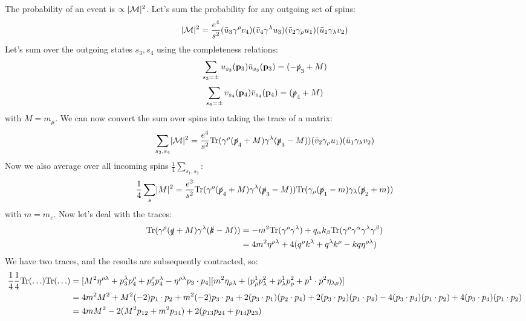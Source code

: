 The probability of an event is $\propto \lvert \mathcal{M} \rvert^2$. Let's sum the probability for any outgoing set of spins:
\begin{equation}
    \lvert \mathcal{M} \rvert^2 = \frac{e^4}{s^2}(\bar{u}_3\gamma^\rho v_4)(\bar{v}_4\gamma^\lambda u_3)(\bar{v}_2\gamma_\rho u_1)(\bar{u}_1\gamma_\lambda v_2)
\end{equation}
Let's sum over the outgoing states $s_3, s_4$ using the completeness relations:
\begin{equation}
    \sum_{s_3 = \pm}u_{s_3}(\mathbf{p}_3)\bar{u}_{s_3}(\mathbf{p}_3) = (-\slashed{p}_3 + M)
\end{equation}
\begin{equation}
    \sum_{s_4 = \pm}v_{s_4}(\mathbf{p}_4)\bar{v}_{s_4}(\mathbf{p}_4) = (\slashed{p}_4 + M)
\end{equation}
with $M = m_\mu$. We can now convert the sum over spins into taking the trace of a matrix:
\begin{equation}
    \sum_{s_3, s_4}\lvert \mathcal{M} \rvert^2 = \frac{e^4}{s^2}\text{Tr}(\gamma^\rho(\slashed{p}_4 + M)\gamma^\lambda(\slashed{p}_3 - M))(\bar{v}_2\gamma_\rho u_1)(\bar{u}_1\gamma_\lambda v_2)
\end{equation}
Now we also average over all incoming spins $\frac{1}{4}\sum_{s_1, s_2}$:
\begin{equation}
    \frac{1}{4}\sum_{s}\lvert M \rvert^2 = \frac{e^2}{s^2}\mathrm{Tr}(\gamma^\rho (\slashed{p}_4 + M)\gamma^\lambda(\slashed{p}_3 - M))\mathrm{Tr}(\gamma_\rho(\slashed{p}_1 - m)\gamma_\lambda(\slashed{p}_2 + m))
\end{equation}
with $m = m_e$. Now let's deal with the traces:
\begin{equation}
    \begin{split}
        \mathrm{Tr}(\gamma^\rho (\slashed{q} + M)\gamma^\lambda(\slashed{k} - M)) &= -m^2\mathrm{Tr}(\gamma^\rho\gamma^\lambda) + q_\alpha k_\beta\mathrm{Tr}(\gamma^\rho\gamma^\alpha\gamma^\lambda\gamma^\beta)
        \\ &= 4m^2\eta^{\rho\lambda} + 4(q^\rho k^\lambda + q^\lambda k^\rho - kq\eta^{\rho\lambda})
    \end{split}
\end{equation}
We have two traces, and the results are subsequently contracted, so:
\begin{equation}
    \begin{split}
        \frac{1}{4}\frac{1}{4}\mathrm{Tr}(\ldots) \mathrm{Tr}(\ldots) &= [M^2\eta^{\rho\lambda} + p_3^\lambda p_4^\rho + p_3^\rho p_4^\lambda - \eta^{\rho\lambda}p_3\cdot p_4][m^2\eta_{\rho\lambda} + (p^1_\rho p^2_\lambda + p^1_\lambda p^2_\rho + p^1 \cdot p^2 \eta_{\lambda\rho})]
        \\ &= 4m^2M^2 + M^2(-2)p_1 \cdot p_2 + m^2(-2)p_3 \cdot p_4 + 2(p_3 \cdot p_1) (p_2 \cdot p_4) + 2(p_3 \cdot p_2)(p_1 \cdot p_4) - 4(p_3 \cdot p_4)(p_1 \cdot p_2) + 4(p_3 \cdot p_4)(p_1 \cdot p_2)
        \\ &= 4mM^2 - 2(M^2p_{12} + m^2p_{34}) + 2(p_{13}p_{24} + p_{14}p_{23})
    \end{split}
\end{equation}
